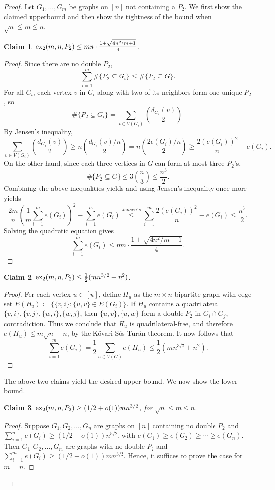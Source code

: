 \documentclass[10pt, reqno]{report}
\newtheorem{claim}{Claim}[theorem]
\newcommand*{\dex}{\textnormal{ex}_2}
\begin{document}
\begin{proof}
  Let $G_1, \ldots, G_m$ be graphs on $[n]$ not containing a $P_2$. We first show the claimed upperbound and then show the tightness of the bound when $\sqrt{n} \leq m \leq n$.
  \begin{claim}
    $\dex(m, n, P_2) \leq mn \cdot \frac{1 + \sqrt{4n^2/m + 1}}{4}$.
  \end{claim}

  \begin{proof}
    Since there are no double $P_2$,
    \[
    \sum_{i = 1}^m \#\{P_2 \subseteq G_i\} \leq \#\{P_2 \subseteq G\}.
    \]
    For all $G_i$, each vertex $v$ in $G_i$ along with two of its neighbors form one unique $P_2$, so
    \[
      \#\{P_2 \subseteq G_i\} = \sum_{v \in V(G_i)} \binom{d_{G_i}(v)}{2}.
    \]
    By Jensen's inequality,
    \[
      \sum_{v \in V(G_i)} \binom{d_{G_i}(v)}{2} \geq n\binom{d_{G_i}(v)/n}{2} = n\binom{2e(G_i)/n}{2} \geq \frac{2(e(G_i))^2}{n} - e(G_i).
    \]
    On the other hand, since each three vertices in $G$ can form at most three $P_2$'s, 
    \[
      \#\{P_2 \subseteq G\} \leq 3\binom{n}{3} \leq \frac{n^3}{2}.
    \]
    Combining the above inequalities yields and using Jensen's inequality once more yields
    \[
      \frac{2m}{n}\left(\frac{1}{m}\sum_{i = 1}^m e(G_i)\right)^2 - \sum_{i = 1}^m e(G_i) \overset{Jensen's}{\leq} \sum_{i = 1}^m \frac{2(e(G_i))^2}{n} - e(G_i) \leq \frac{n^3}{2}.
    \]
    Solving the quadratic equation gives
    \[
      \sum_{i = 1}^m e(G_i) \leq mn \cdot \frac{1 + \sqrt{4n^2/m + 1}}{4}.
    \]
  \end{proof}

  \begin{claim}
    $\dex(m, n, P_2) \leq \frac{1}{2}(mn^{3/2} + n^2)$. 
  \end{claim}

  \begin{proof}
    For each vertex $u \in [n]$, define $H_u$ as the $m \times n$ bipartite graph with edge set $E(H_u) \coloneq \{\{v, i\} : \{u, v\} \in E(G_i)\}$. If $H_u$ contains a quadrilateral $\{v, i\}, \{v, j\}, \{w, i\}, \{w, j\}$, then $\{u, v\}, \{u, w\}$ form a double $P_2$ in $G_i \cap G_j$, contradiction. Thus we conclude that $H_u$ is quadrilateral-free, and therefore $e(H_u) \leq m\sqrt{n} + n$, by the Kővari-Sós-Turán theorem. It now follows that
    \[
      \sum_{i = 1}^m e(G_i) = \frac{1}{2}\sum_{u \in V(G)} e(H_u) \leq \frac{1}{2}(mn^{3/2} + n^2).
    \]
  \end{proof}
  The above two claims yield the desired upper bound. We now show the lower bound.
  \begin{claim}
    $\dex(m, n, P_2) \geq (1/2 + o(1))mn^{3/2}$, for $\sqrt{n} \leq m \leq n$.
  \end{claim}
  \begin{proof}
    Suppose $G_1, G_2, \ldots, G_n$ are graphs on $[n]$ containing no double $P_2$ and $\sum_{i = 1}^n e(G_i) \geq (1/2 + o(1))n^{5/2}$, with $e(G_1) \geq e(G_2) \geq \cdots \geq e(G_n)$. Then $G_1, G_2, \ldots, G_m$ are graphs with no double $P_2$ and $\sum_{i = 1}^m e(G_i) \geq (1/2 + o(1))mn^{3/2}$. Hence, it suffices to prove the case for $m = n$.


\end{proof}
\end{proof}
\end{document}
